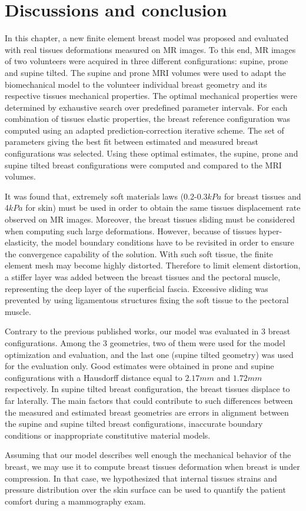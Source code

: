 \section{Discussions and conclusion} \label{section:validation:discutionconclusion}

In this chapter, a new finite element breast model was proposed and  evaluated with real tissues deformations measured on MR images. To this end, MR images of two volunteers were acquired in three different configurations: supine, prone and supine tilted. The supine and prone MRI volumes were used to adapt the biomechanical model to the volunteer individual breast geometry and its respective tissues mechanical properties.  The optimal mechanical properties were determined by exhaustive search over predefined parameter intervals. For each combination of tissues elastic properties,  the breast reference configuration was computed using an adapted prediction-correction iterative scheme. The set of parameters giving the best fit between estimated and measured breast configurations was selected.  Using these optimal estimates, the supine, prone and supine tilted breast configurations were computed and compared to the MRI volumes.

It was found that, extremely soft materials laws (0.2-0.3$kPa$ for breast tissues and 4$kPa$ for skin) must be used in order to obtain the same tissues displacement rate observed on MR images. Moreover, the breast tissues sliding must be considered when computing such large deformations. However, because of tissues hyper-elasticity, the model boundary conditions have to be revisited in order to ensure the convergence capability of the solution. With such soft tissue, the finite element mesh may become highly distorted. Therefore to limit element distortion, a stiffer layer was added between the breast tissues and the pectoral muscle, representing the deep layer of the superficial fascia. Excessive  sliding was prevented by using ligamentous structures fixing the soft tissue to the pectoral muscle.

Contrary to the previous published works, our model was evaluated in 3 breast configurations. Among the 3 geometries, two of them were used for the model optimization and evaluation, and the last one (supine tilted geometry) was used for the evaluation only. Good estimates were obtained in prone and supine configurations with a Hausdorff distance equal to $2.17 mm$ and $1.72 mm$ respectively.  In supine tilted breast configuration, the breast tissues displace to far laterally.  The main factors that could contribute to such differences between the measured and estimated breast geometries are errors in alignment between the supine and supine tilted breast configurations, inaccurate boundary conditions or inappropriate constitutive material models. 

Assuming that our model describes well enough the mechanical behavior of the breast, we may use it to compute breast tissues deformation when breast is under compression. In that case, we hypothesized that internal tissues strains and pressure distribution over the skin surface can be used to quantify the patient comfort during a mammography exam. 
   